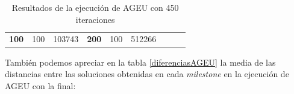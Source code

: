 \begin{table}[]
\begin{tabular}{|cccccclll}
\multicolumn{1}{|c|}{\multirow{-39}{*}{\cellcolor[HTML]{FFFFC7}\textbf{100}}} & \multicolumn{1}{c|}{\multirow{-9}{*}{\cellcolor[HTML]{DDFDFF}100}} & \multicolumn{1}{c|}{\cellcolor[HTML]{DAE8FC}103743}    & \multicolumn{1}{c|}{\multirow{-39}{*}{\cellcolor[HTML]{FFFFC7}\textbf{200}}} & \multicolumn{1}{c|}{\multirow{-10}{*}{\cellcolor[HTML]{DDFDFF}100}} & \multicolumn{1}{c|}{\cellcolor[HTML]{DDFDFF}512266}    &                                                                              &                                                                    &                                                        \\ \cline{1-6}
\end{tabular}
\caption{\label{AGEU450}Resultados de la ejecución de AGEU con 450 iteraciones}
\end{table}

También podemos apreciar en la tabla \ref{diferenciasAGEU} la media de las distancias entre las soluciones obtenidas en cada \textit{milestone} en la ejecución de AGEU con la final:

